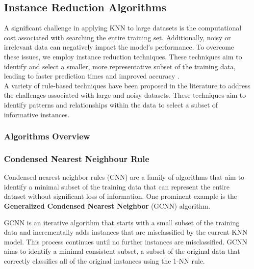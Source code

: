
\subsection{Instance Reduction Algorithms}
\label{subsec:methods-reduction}

A significant challenge in applying KNN to large datasets is the computational cost 
associated with searching the entire training set. Additionally, noisy or irrelevant 
data can negatively impact the model's performance. 
To overcome these issues, we employ instance reduction techniques. 
These techniques aim to identify and select a smaller, more representative subset of
the training data, leading to faster prediction times and improved accuracy \cite{Wilson2000,largeScaleKNN}.\\

A variety of rule-based techniques have been proposed in the literature to 
address the challenges associated with large and noisy datasets. 
These techniques aim to identify patterns and relationships within the data to select 
a subset of informative instances.

\subsubsection{Algorithms Overview}

\subsubsection*{Condensed Nearest Neighbour Rule}
Condensed nearest neighbor rules (CNN) are a family of algorithms that aim to identify 
a minimal subset of the training data that can represent the entire dataset without 
significant loss of information. One prominent example is the \textbf{Generalized Condensed 
Nearest Neighbor} (GCNN) algorithm.

GCNN \cite{hart1968condensed} is an iterative algorithm that starts with a small subset of 
the training data and incrementally adds instances that are misclassified by the current KNN model. 
This process continues until no further instances are misclassified. GCNN aims to identify a minimal 
consistent subset, a subset of the original data that correctly classifies all of the original 
instances using the 1-NN rule.

